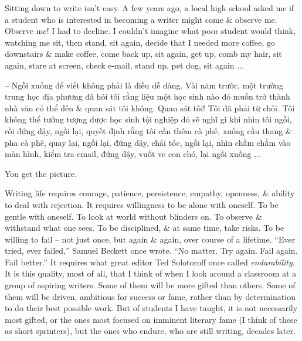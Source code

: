 \documentclass{article}
\begin{document}
\begin{itemize}
	Sitting down to write isn't easy. A few years ago, a local high school asked me if a student who is interested in becoming a writer might come \& observe me. Observe me! I had to decline. I couldn't imagine what poor student would think, watching me sit, then stand, sit again, decide that I needed more coffee, go downstairs \& make coffee, come back up, sit again, get up, comb my hair, sit again, stare at screen, check e-mail, stand up, pet dog, sit again $\ldots$
	
	-- Ngồi xuống để viết không phải là điều dễ dàng. Vài năm trước, một trường trung học địa phương đã hỏi tôi rằng liệu một học sinh nào đó muốn trở thành nhà văn có thể đến \& quan sát tôi không. Quan sát tôi! Tôi đã phải từ chối. Tôi không thể tưởng tượng được học sinh tội nghiệp đó sẽ nghĩ gì khi nhìn tôi ngồi, rồi đứng dậy, ngồi lại, quyết định rằng tôi cần thêm cà phê, xuống cầu thang \& pha cà phê, quay lại, ngồi lại, đứng dậy, chải tóc, ngồi lại, nhìn chằm chằm vào màn hình, kiểm tra email, đứng dậy, vuốt ve con chó, lại ngồi xuống $\ldots$
	
	You get the picture.
	
	Writing life requires courage, patience, persistence, empathy, openness, \& ability to deal with rejection. It requires willingness to be alone with oneself. To be gentle with oneself. To look at world without blinders on. To observe \& withstand what one sees. To be disciplined, \& at same time, take risks. To be willing to fail -- not just once, but again \& again, over course of a lifetime. ``Ever tried, ever failed,'' {\sc Samuel Beckett} once wrote. ``No matter. Try again. Fail again. Fail better.'' It requires what great editor {\sc Ted Solotoroff} once called {\it endurability}. It is this quality, most of all, that I think of when I look around a classroom at a group of aspiring writers. Some of them will be more gifted than others. Some of them will be driven, ambitious for success or fame, rather than by determination to do their best possible work. But of students I have taught, it is not necessarily most gifted, or the ones most focused on imminent literary fame (I think of these as short sprinters), but the ones who endure, who are still writing, decades later.
	

\end{itemize}
\end{document}
